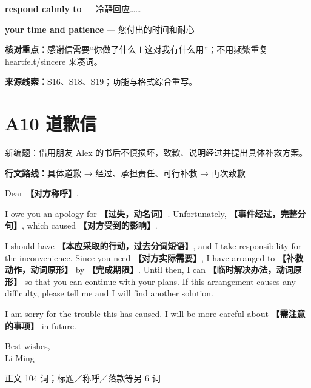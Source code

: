 \documentclass[11pt,a4paper,fontset=macnew]{ctexart}
\newenvironment{writing}{\begingroup\fontsize{10.5}{13.5}\selectfont\setlength{\parskip}{3pt}}{\par\endgroup}
\begin{document}
{\small\textbf{respond calmly to} — 冷静回应……}\par
{\small\textbf{your time and patience} — 您付出的时间和耐心}\par
{\small\textbf{核对重点：}感谢信需要“你做了什么＋这对我有什么用”；不用频繁重复 heartfelt/sincere 来凑词。}\par
{\fontsize{8}{10}\selectfont\textbf{来源线索：}S16、S18、S19；功能与格式综合重写。}\par
\clearpage\section*{A10  道歉信}
{\small 新编题：借用朋友 Alex 的书后不慎损坏，致歉、说明经过并提出具体补救方案。}\par
{\small\textbf{行文路线：}具体道歉 → 经过、承担责任、可行补救 → 再次致歉}\par
\par\vspace{4pt}{\bfseries 可替换模板}\par\nopagebreak
\begin{writing}
\noindent Dear {\bfseries 【对方称呼】},\par
I owe you an apology for {\bfseries 【过失，动名词】}. Unfortunately, {\bfseries 【事件经过，完整分句】}, which caused {\bfseries 【对方受到的影响】}.

I should have {\bfseries 【本应采取的行动，过去分词短语】}, and I take responsibility for the inconvenience. Since you need {\bfseries 【对方实际需要】}, I have arranged to {\bfseries 【补救动作，动词原形】} by {\bfseries 【完成期限】}. Until then, I can {\bfseries 【临时解决办法，动词原形】} so that you can continue with your plans. If this arrangement causes any difficulty, please tell me and I will find another solution.

I am sorry for the trouble this has caused. I will be more careful about {\bfseries 【需注意的事项】} in future.

\noindent Best wishes,\\Li Ming\par
\end{writing}
\par\vspace{4pt}{\bfseries 完整套用示例}\par\nopagebreak
{\small 正文 104 词；标题／称呼／落款等另 6 词}\par
\end{document}
